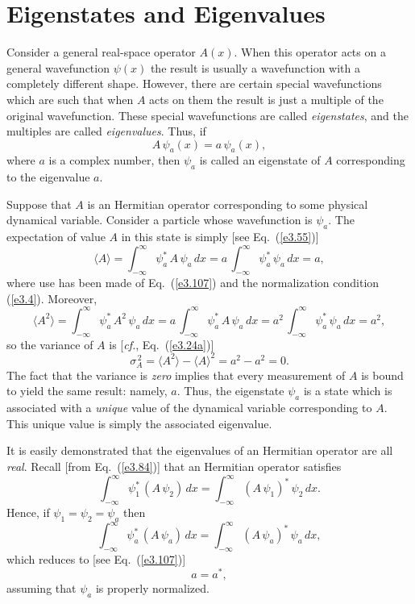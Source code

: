\section{Eigenstates and Eigenvalues}\label{seig}
Consider a general real-space operator $A(x)$. When this operator
acts on a general wavefunction $\psi(x)$ the result is usually a wavefunction
with a completely different shape. However, there are certain special
wavefunctions which are such that when $A$ acts on them the
result is just a multiple of the original wavefunction. These special
wavefunctions are called {\em eigenstates}, and the multiples
are called {\em eigenvalues}. Thus, if
\begin{equation}\label{e3.107}
A\,\psi_a(x) = a\,\psi_a(x),
\end{equation}
where $a$ is a complex number, then $\psi_a$ is called an eigenstate of
$A$ corresponding to the eigenvalue $a$.

Suppose that $A$ is an Hermitian operator corresponding to some physical dynamical
variable.
Consider a particle whose wavefunction is $\psi_a$. The expectation of
value $A$ in this state is simply [see Eq.~(\ref{e3.55})]
\begin{equation}
\langle A\rangle = \int_{-\infty}^\infty \psi_a^{\ast}\,A\,\psi_a\,dx
= a\,\int_{-\infty}^\infty \psi_a^{\ast}\,\psi_a\,dx =a,
\end{equation}
where use has been made of Eq.~(\ref{e3.107}) and the normalization
condition (\ref{e3.4}). Moreover, 
\begin{equation}
\langle A^2\rangle = \int_{-\infty}^\infty \psi_a^{\ast}\,A^2\,\psi_a\,dx
= a\,\int_{-\infty}^\infty \psi_a^{\ast}\,A\,\psi_a\,dx =a^2\,\int_{-\infty}^\infty \psi_a^{\ast}\,\psi_a\,dx =a^2,
\end{equation}
so
the variance of $A$ is [{\em cf.}, Eq.~(\ref{e3.24a})]
\begin{equation}
\sigma_A^{\,2} = \langle A^2\rangle - \langle A\rangle^2 = a^2-a^2 = 0.
\end{equation}
The fact that the variance is {\em zero}\/ implies that every measurement of $A$ is bound to
yield the same result: namely,  $a$.  Thus, the eigenstate $\psi_a$ is a state which is
associated with a {\em unique}\/ value of the dynamical variable corresponding to $A$. This
unique value is simply the associated eigenvalue.

It is easily demonstrated that the eigenvalues of an Hermitian operator
are all {\em real}. Recall [from Eq.~(\ref{e3.84})] that an
Hermitian operator satisfies
\begin{equation}\label{e3.111}
\int_{-\infty}^\infty \psi_1^\ast\,(A\,\psi_2)\,dx = \int_{-\infty}^\infty
(A\,\psi_1)^\ast\,\psi_2\,dx.
\end{equation}
Hence, if $\psi_1=\psi_2=\psi_a$ then
\begin{equation}
\int_{-\infty}^\infty \psi_a^\ast\,(A\,\psi_a)\,dx = \int_{-\infty}^\infty
(A\,\psi_a)^\ast\,\psi_a\,dx,
\end{equation}
which reduces to [see Eq.~(\ref{e3.107})]
\begin{equation}
a=a^\ast,
\end{equation}
assuming that $\psi_a$ is properly normalized.

